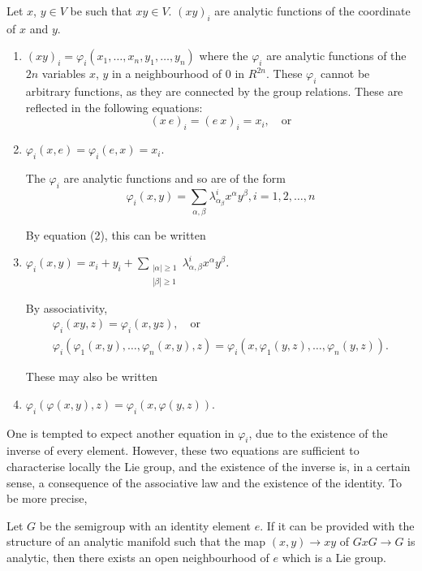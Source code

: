 Let $x$, $y \in V$ be such that $xy \in V$. $(xy)_i$ are analytic
functions of the coordinate of $x$ and $y$. 
\begin{enumerate}
\renewcommand{\labelenumi}{(\theenumi)}
\item  $(xy)_i=\varphi_i(x_1, \ldots , x_n, y_1, \ldots , y_n)$ where
  the $\varphi_i$ are analytic functions of the $2n$ variables $x$, $y$
  in a neighbourhood of $0$ in $R^{2n}$. These $\varphi_i$ cannot be
  arbitrary functions, as they are connected by the group
  relations. These are reflected in the following equations: 
$$
(x\  e)_i=(e\ x)_i =x_i,\quad\text{or} 
$$ 

\item $\varphi_i(x, e)= \varphi_i(e,x)=x_i$.\pageoriginale

The $\varphi_i$ are analytic functions and so are of the form 
$$
\varphi_i(x,y)= \sum_{\alpha, \beta}\lambda^i_{\alpha_\beta}
x^{\alpha}y^{\beta}, i = 1, 2, \ldots , n  
$$

By equation (2), this can be written

\item $\varphi_i (x,y)=x_i+y_i+ \sum_{\substack{| \alpha
    | \ge 1 \\ | \beta | \ge 1}} \lambda^i_{\alpha,\beta}
  x^{\alpha} y^{\beta}$. 

By associativity,
\begin{align*}
\varphi_{i}(xy,z) = \varphi_{i} (x,yz),\quad\text{or}\\
\varphi_i(\varphi_1(x,y), \ldots , \varphi_n(x,y),z)=\varphi_i(x,
\varphi_1(y,z), \ldots , \varphi_n(y,z)). 
\end{align*}

These may also be written

\item $\varphi_i(\varphi(x,y),z)=\varphi_i(x, \varphi(y,z))$. 
\end{enumerate}

One is tempted to expect another equation in $\varphi_i$, due to the
existence of the inverse of every element. However, these two
equations are sufficient to characterise locally the Lie group, and
the existence of the inverse is, in a certain sense, a consequence of
the associative law and the existence of the identity. To be more
precise, 

\setcounter{proposition}{0}
\begin{proposition}\label{chap2-prop1}%
 Let $G$ be the semigroup with an identity element $e$. If it can be
 provided with the structure of an analytic manifold such that the map
 $(x,y)\rightarrow xy$ of $G x G \rightarrow G $ is analytic, then
 there exists an open neighbourhood of $e$ which is a Lie group. 
\end{proposition}

